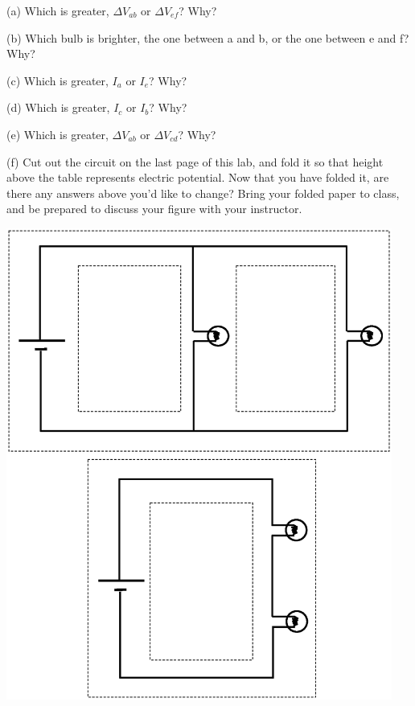 (a) Which is greater, $\Delta V_{ab}$ or  $\Delta V_{ef}$?  Why?
\vspace{0.6 in}

(b) Which bulb is brighter, the one between a and b, or the one between e and f?  Why?
\vspace{0.6 in}

(c) Which is greater, $I_a$ or $I_e$?  Why?
\vspace{0.6 in}

(d) Which is greater, $I_c$ or $I_b$? Why?
\vspace{0.6 in}

(e) Which is greater, $\Delta V_{ab}$ or  $\Delta V_{cd}$? Why?
\vspace{0.6 in}

(f) Cut out the circuit on the last page of this lab, and fold it so that height above the table represents electric potential.  Now that you have folded it, are there any answers above you’d like to change?  Bring your folded paper to class, and be prepared to discuss your figure with your instructor.
\vspace{0.6 in}

\cleardoublepage %
\begin{center}
\includegraphics[width=0.95\textwidth]{electric_circuits/cutout_page1.eps}
\end{center}

